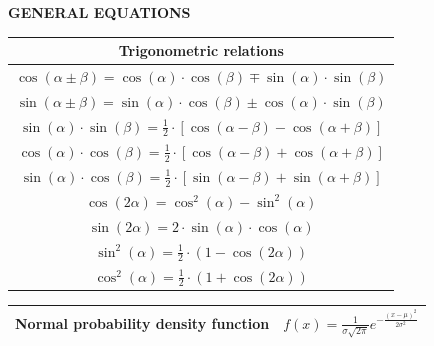 \documentclass[en]{article}
\begin{document}
\begin{center}

   {\bf GENERAL EQUATIONS}
    
    \vspace{0.5cm}

    \renewcommand{\arraystretch}{1.6}
    \begin{tabular}{|c|}
        \multicolumn{1}{c}{{\bf Trigonometric relations}}\\
        \hline 
        $\cos (\alpha \pm \beta) = \cos (\alpha) \cdot \cos (\beta) \mp \sin (\alpha) \cdot \sin (\beta)$ \\
        \hline 
        $\sin (\alpha \pm \beta) = \sin (\alpha) \cdot \cos (\beta) \pm \cos(\alpha) \cdot \sin (\beta)$ \\
        \hline 
        $\sin (\alpha) \cdot \sin (\beta) = \frac{1}{2} \cdot \left [ \cos (\alpha - \beta ) - \cos (\alpha + \beta ) \right ]$ \\ 
        \hline 
        $\cos (\alpha) \cdot \cos (\beta) = \frac{1}{2} \cdot \left [ \cos (\alpha - \beta ) + \cos (\alpha + \beta ) \right ]$ \\
        \hline 
        $\sin (\alpha) \cdot \cos (\beta) = \frac{1}{2} \cdot \left [ \sin (\alpha - \beta ) + \sin (\alpha + \beta ) \right ]$ \\ 
        \hline 
        $\cos (2 \alpha) = \cos^2 (\alpha) - \sin^2 (\alpha)$ \\ 
        \hline 
        $\sin (2 \alpha) = 2 \cdot \sin (\alpha) \cdot \cos (\alpha)$ \\
        \hline 
        $\sin^2 (\alpha) = \frac{1}{2} \cdot \left ( 1 - \cos (2 \alpha) \right )$ \\
        \hline 
        $\cos^2 (\alpha) = \frac{1}{2} \cdot \left ( 1 + \cos (2 \alpha) \right )$ \\
        \hline
    \end{tabular}
    \renewcommand{\arraystretch}{1}
    \vspace{0.5cm}

    \renewcommand{\arraystretch}{2}
        \begin{tabular}{|c|c|}
            \hline 
            Normal probability density function & $f(x) = \displaystyle\frac{1}{\sigma \sqrt{2 \pi}} e^{- \displaystyle\frac{(x - \mu)^2}{2 \sigma^2}}$ \\
            \hline
        \end{tabular}
    \renewcommand{\arraystretch}{1}
    \vspace{0.5cm}
    

\end{center}
\end{document}
